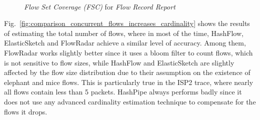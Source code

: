 \begin{figure}[ht!]
    \centering
    \mbox{
    }
    \caption{\emph{Flow Set Coverage (FSC)} for \emph{Flow Record Report}}
    \label{fig:comparison_concurrent_flows_increases_flow_monitoring}
\end{figure}

Fig.~\ref{fig:comparison_concurrent_flows_increases_cardinality} shows the results 
of estimating the total number of flows, where in most of the time, 
HashFlow, ElasticSketch and FlowRadar achieve a similar level of accuracy. 
Among them, FlowRadar works slightly better since it uses a bloom filter to count flows, 
which is not sensitive to flow sizes, while HashFlow and ElasticSketch are slightly affected 
by the flow size distribution due to their assumption on the existence of elephant and mice flows. 
This is particularly true in the ISP2 trace, where nearly all flows contain less than 5 packets.
HashPipe always performs badly since it does not use any advanced cardinality estimation technique 
to compensate for the flows it drops. 

